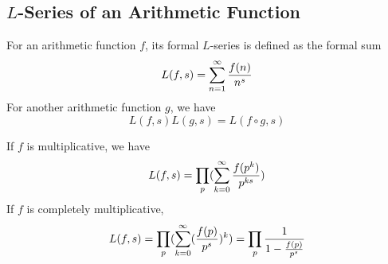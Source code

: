 \documentclass{article}
\begin{document}
\subsection{$L$-Series of an Arithmetic Function}
For an arithmetic function $f$, its formal $L$-series is defined as the formal sum
\begin{equation*}
  L(f, s) = \sum_{n=1}^\infty {f(n) \over n^s}
\end{equation*}
For another arithmetic function $g$, we have
\begin{equation*}
  L(f, s) L(g, s) = L(f \circ g, s)
\end{equation*}

If $f$ is multiplicative, we have
\begin{equation*}
  L(f, s) = \prod_p (\sum_{k=0}^\infty {f(p^k) \over p^{ks}})
\end{equation*}
If $f$ is completely multiplicative,
\begin{equation*}
  L(f, s)
  = \prod_p (\sum_{k=0}^\infty ({f(p) \over p^s})^k)
  = \prod_p {1 \over 1 - {f(p) \over p^s}}
\end{equation*}
\end{document}
